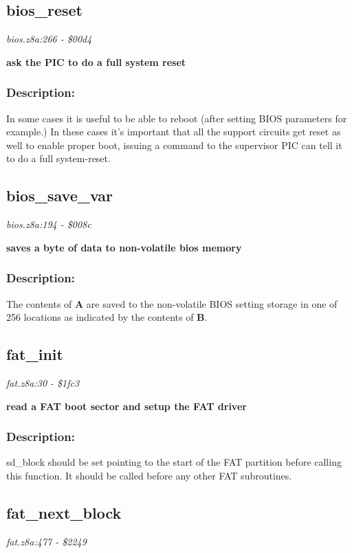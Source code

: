 \subsection{bios\_reset}
\textit{bios.z8a:266 - \$00d4}

\noindent
\textbf{ask the PIC to do a full system reset}

\subsubsection{Description:}
 In some cases it is useful to be able to reboot (after setting BIOS parameters for example.)  In these cases it's important that all the support circuits get reset as well to enable proper boot, issuing a command to the supervisor PIC can tell it to do a full system-reset.

\subsection{bios\_save\_var}
\textit{bios.z8a:194 - \$008c}

\noindent
\textbf{saves a byte of data to non-volatile bios memory}

\subsubsection{Description:}
 The contents of \textbf{A} are saved to the non-volatile BIOS setting storage in one of 256 locations as indicated by the contents of \textbf{B}.

\subsection{fat\_init}
\textit{fat.z8a:30 - \$1fc3}

\noindent
\textbf{read a FAT boot sector and setup the FAT driver}

\subsubsection{Description:}
 sd\_block should be set pointing to the start of the FAT partition before  calling this function.  It should be called before any other FAT subroutines.

\subsection{fat\_next\_block}
\textit{fat.z8a:477 - \$2249}

